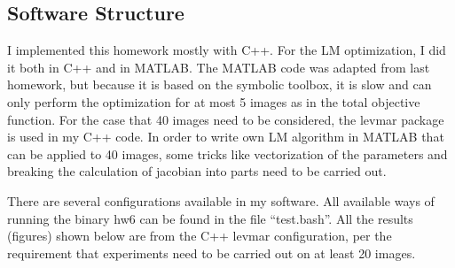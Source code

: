 \documentclass[12pt]{article}
\begin{document}
\subsection{Software Structure}
I implemented this homework mostly with C++. For the LM optimization, I did it both in C++ and in MATLAB. The MATLAB code was adapted from last homework, but because it is based on the symbolic toolbox, it is slow and can only perform the optimization for at most 5 images as in the total objective function. For the case that 40 images need to be considered, the levmar package is used in my C++ code. In order to write own LM algorithm in MATLAB that can be applied to 40 images, some tricks like vectorization of the parameters and breaking the calculation of jacobian into parts need to be carried out.

There are several configurations available in my software. All available ways of running the binary hw6 can be found in the file ``test.bash''. All the results (figures) shown below are from the C++ levmar configuration, per the requirement that experiments need to be carried out on at least 20 images. %
\end{document}
